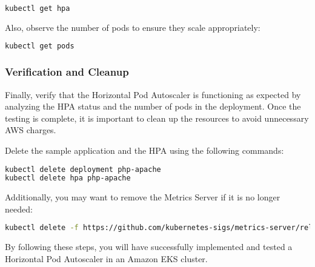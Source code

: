 \begin{lstlisting}[language=bash]
kubectl get hpa
\end{lstlisting}

Also, observe the number of pods to ensure they scale appropriately:

\begin{lstlisting}[language=bash]
kubectl get pods
\end{lstlisting}

\subsubsection{Verification and Cleanup}

Finally, verify that the Horizontal Pod Autoscaler is functioning as expected by analyzing the HPA status and the number of pods in the deployment. Once the testing is complete, it is important to clean up the resources to avoid unnecessary AWS charges.

Delete the sample application and the HPA using the following commands:

\begin{lstlisting}[language=bash]
kubectl delete deployment php-apache
kubectl delete hpa php-apache
\end{lstlisting}

Additionally, you may want to remove the Metrics Server if it is no longer needed:

\begin{lstlisting}[language=bash]
kubectl delete -f https://github.com/kubernetes-sigs/metrics-server/releases/latest/download/components.yaml
\end{lstlisting}

By following these steps, you will have successfully implemented and tested a Horizontal Pod Autoscaler in an Amazon EKS cluster.
